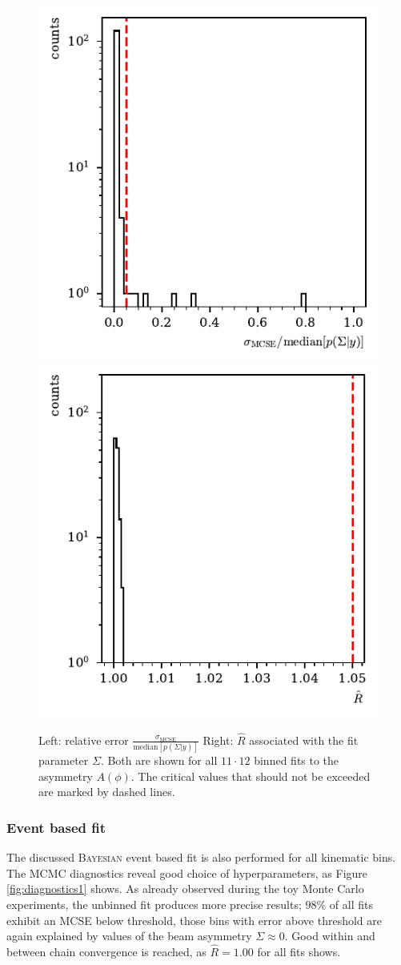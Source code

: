 \begin{figure}[htbp]
	\includegraphics[width=.49\linewidth]{../bayes/realdeal/plots/mcse_hist.pdf}
	\includegraphics[width=.49\linewidth]{../bayes/realdeal/plots/rhat_hist.pdf}
	\caption{ Left: relative error $\frac{\sigma_\text{MCSE}}{\text{median}\left[p\left(\Sigma|y\right)\right]}$ Right: $\widehat{R}$ associated with the fit parameter $\Sigma$. Both are shown for all $11\cdot12$ binned fits to the asymmetry $A\left(\phi\right)$. The critical values that should not be exceeded are marked by dashed lines.}
	\label{fig:diagnostics}
\end{figure}
\subsubsection{Event based fit}
The discussed \textsc{Bayesian} event based fit is also performed for all kinematic bins. The MCMC diagnostics reveal good choice of hyperparameters, as Figure \ref{fig:diagnostics1} shows. As already observed during the toy Monte Carlo experiments, the unbinned fit produces more precise results; $98\%$ of all fits exhibit an MCSE below threshold, those bins with error above threshold are again explained by values of the beam asymmetry $\Sigma\approx0.$ Good within and between chain convergence is reached, as $\widehat{R}=1.00$ for all fits shows.

